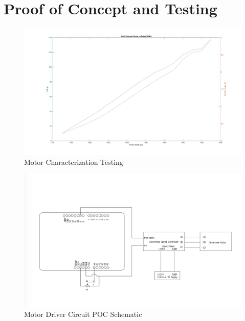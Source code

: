 \section{Proof of Concept and Testing}

\begin{figure}[h]
  \centering
  \includegraphics[width=1\textwidth]{Motor_Characterization.jpg}
  \caption{Motor Characterization Testing}
  \label{fig:Motor_Char}
\end{figure}

\begin{figure}[h]
  \centering
  \includegraphics[width=1\textwidth]{Motor_Driving_Schematic.jpg}
  \caption{Motor Driver Circuit POC Schematic}
  \label{fig:Motor_Drive_Schem}
\end{figure}


